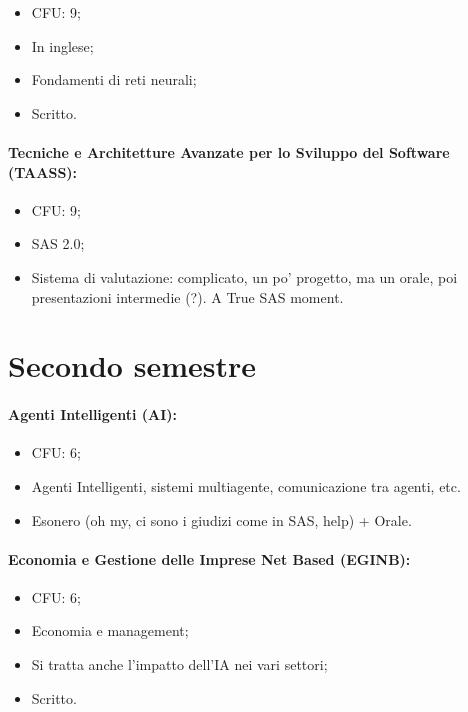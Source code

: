 \begin{itemize}
  \item CFU: 9;
  \item In inglese;
  \item Fondamenti di reti neurali;
  \item Scritto.
\end{itemize}

\paragraph{Tecniche e Architetture Avanzate per
lo Sviluppo del Software (TAASS):}

\begin{itemize}
  \item CFU: 9;
  \item SAS 2.0;
  \item Sistema di valutazione: complicato, un po' progetto, ma un orale, poi presentazioni intermedie (?). A True SAS moment.
\end{itemize}

\section{Secondo semestre}

\paragraph{Agenti Intelligenti (AI):}

\begin{itemize}
  \item CFU: 6;
  \item Agenti Intelligenti, sistemi multiagente, comunicazione tra agenti, etc. 
  \item Esonero (oh my, ci sono i giudizi come in SAS, help) + Orale.
\end{itemize}

\paragraph{Economia e Gestione delle Imprese Net Based (EGINB):}

\begin{itemize}
  \item CFU: 6;
  \item Economia e management;
  \item Si tratta anche l'impatto dell'IA nei vari settori;
  \item Scritto.
\end{itemize}

